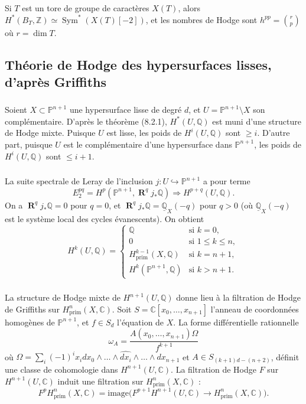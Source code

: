 \documentclass[11pt]{amsart}
\theoremstyle{plain}
\theoremstyle{definition}
\DeclareMathOperator{\Rd}{\mathbf{R}}
\DeclareMathOperator{\Sym}{Sym}
\newcommand{\CC}{\mathbb{C}}
\newcommand{\PP}{\mathbb{P}}
\newcommand{\QQ}{\mathbb{Q}}
\newcommand{\ZZ}{\mathbb{Z}}
\begin{document}
\subsubsection{}
Si $T$ est un tore de groupe de caract\`eres $X(T)$, alors $H^*(B_T, \ZZ) \simeq \Sym^*(X(T)[-2])$, et les nombres de Hodge sont $h^{pp} = \binom{r}{p}$ o\`u $r = \dim T$.

\subsection{Th\'eorie de Hodge des hypersurfaces lisses, d'apr\`es Griffiths}

\subsubsection{}
Soient $X \subset \PP^{n+1}$ une hypersurface lisse de degr\'e $d$, et $U = \PP^{n+1} \setminus X$ son compl\'ementaire. D'apr\`es le th\'eor\`eme (8.2.1), $H^*(U, \QQ)$ est muni d'une structure de Hodge mixte. Puisque $U$ est lisse, les poids de $H^i(U, \QQ)$ sont $\geq i$. D'autre part, puisque $U$ est le compl\'ementaire d'une hypersurface dans $\PP^{n+1}$, les poids de $H^i(U, \QQ)$ sont $\leq i+1$.

\subsubsection{}
La suite spectrale de Leray de l'inclusion $j : U \hookrightarrow \PP^{n+1}$ a pour terme
\[
E_2^{pq} = H^p(\PP^{n+1}, \Rd^q j_* \QQ) \Rightarrow H^{p+q}(U, \QQ).
\]
On a $\Rd^q j_* \QQ = 0$ pour $q = 0$, et $\Rd^q j_* \QQ = \underline{\QQ}_X(-q)$ pour $q > 0$ (o\`u $\underline{\QQ}_X(-q)$ est le syst\`eme local des cycles \'evanescents). On obtient
\[
H^k(U, \QQ) = \begin{cases}
\QQ & \text{si } k = 0, \\
0 & \text{si } 1 \leq k \leq n, \\
H^{k-1}_{\mathrm{prim}}(X, \QQ) & \text{si } k = n+1, \\
H^k(\PP^{n+1}, \QQ) & \text{si } k > n+1.
\end{cases}
\]

\subsubsection{}
La structure de Hodge mixte de $H^{n+1}(U, \QQ)$ donne lieu \`a la filtration de Hodge de Griffiths sur $H^n_{\mathrm{prim}}(X, \CC)$. Soit $S = \CC[x_0, \ldots, x_{n+1}]$ l'anneau de coordonn\'ees homog\`enes de $\PP^{n+1}$, et $f \in S_d$ l'\'equation de $X$. La forme diff\'erentielle rationnelle
\[
\omega_A = \frac{A(x_0, \ldots, x_{n+1}) \Omega}{f^{k+1}}
\]
o\`u $\Omega = \sum_i (-1)^i x_i dx_0 \wedge \ldots \wedge \widehat{dx_i} \wedge \ldots \wedge dx_{n+1}$ et $A \in S_{(k+1)d - (n+2)}$, d\'efinit une classe de cohomologie dans $H^{n+1}(U, \CC)$. La filtration de Hodge $F$ sur $H^{n+1}(U, \CC)$ induit une filtration sur $H^n_{\mathrm{prim}}(X, \CC)$ :
\[
F^p H^n_{\mathrm{prim}}(X, \CC) = \mathrm{image}\big(F^{p+1} H^{n+1}(U, \CC) \to H^n_{\mathrm{prim}}(X, \CC)\big).
\]
\end{document}
